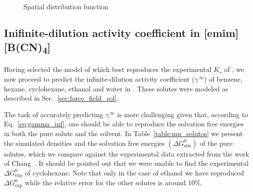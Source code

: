 \documentclass[3p,twocolumn]{elsarticle}
\begin{document}
\begin{figure}
\centering
{}

\caption{Spatial distribution function}
\label{fig:sdf}
\end{figure}

\subsection{Inifinite-dilution activity coefficient in [emim] [B(CN)\textsubscript{4}]}
\label{sec:act_results}

Having selected the model of \ce{[emim][B(CN)_4]} which best reproduces the experimental $K_s$ of , we now proceed to predict the infinite-dilution activity coefficient ($\gamma^{\, \infty}$) of benzene, hexane, cyclohexane, ethanol and water in \ce{[emim][B(CN)_4]}. These solutes were modeled as described in Sec.~\ref{sec:force_field_sol}.

The task of accurately predicting $\gamma^{\, \infty}$ is more challenging given that, according to Eq.~\ref{eq:gamma_inf}, one should be able to reproduce the solvation free energies in both the pure solute and the solvent. In Table~\ref{table:mu_solutos} we present the simulated densities and the solvation free energies  $(\Delta G^{0}_{\text{sim}})$ of the pure solutes, which we compare against the experimental data extracted from the work of Chang~\cite{Chang_2009}. It should be pointed out that we were unable to find the experimental $\Delta G^{0}_\text{exp}$ of cyclohexane. Note that only in the case of ethanol we have reproduced $\Delta G^{0}_\text{exp}$ while the relative error for the other solutes is around 10\%.
\end{document}
